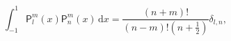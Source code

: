 \[\int_{-1}^{1}\mathsf{P}^{m}_{l}\left(x\right)\mathsf{P}^{m}_{n}\left(x\right)%
\,\mathrm{d}x=\frac{(n+m)!}{(n-m)!\left(n+\frac{1}{2}\right)}\delta_{l,n},\]